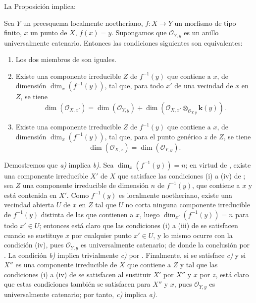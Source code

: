 La Proposición  implica:

\begin{corollary}[13.2.9]
\label{IV.13.2.9}
Sea $Y$ un preesquema localmente noetheriano, $f:X\to Y$ un morfismo de tipo finito, $x$ un punto de $X$, $f(x)=y$.
Supongamos que $\mathcal O_{Y,y}$ es un anillo universalmente catenario.
Entonces las condiciones siguientes son equivalentes:
\begin{enumerate}[label=\emph{\alph*)}]
  \item Los dos miembros de  son iguales.
  \item Existe una componente irreducible $Z$ de $f^{-1}(y)$ que contiene a $x$, de dimensión $\dim_x(f^{-1}(y))$, tal que, para todo $x'$ de una vecindad de $x$ en $Z$, se tiene
  \[
  \tag{13.2.9.1}
  \label{IV.13.2.9.1-fr}
    \dim(\mathcal O_{X,x'})=\dim(\mathcal O_{Y,y})
    +\dim(\mathcal O_{X,x'}\otimes_{\mathcal O_{Y,y}}\boldsymbol{k}(y)).
  \]
  \item Existe una componente irreducible $Z$ de $f^{-1}(y)$ que contiene a $x$, de dimensión $\dim_x(f^{-1}(y))$, tal que, para el punto genérico $z$ de $Z$, se tiene
  \[
  \tag{13.2.9.2}
  \label{IV.13.2.9.2-fr}
    \dim(\mathcal O_{X,z})=\dim(\mathcal O_{Y,y}).
  \]
\end{enumerate}
\end{corollary}

Demostremos que \emph{a)} implica \emph{b)}.
Sea $\dim_x(f^{-1}(y))=n$; en virtud de , existe una componente irreducible $X'$ de $X$ que satisface las condiciones (i) a (iv) de ; sea $Z$ una componente irreducible de dimensión $n$ de $f^{-1}(y)$, que contiene a $x$ y está contenida en $X'$.
Como $f^{-1}(y)$ es localmente noetheriano, existe una vecindad abierta $U$ de $x$ en $Z$ tal que $U$ no corta ninguna componente irreducible de $f^{-1}(y)$ distinta de las que contienen a $x$, luego  $\dim_{x'}(f^{-1}(y))=n$ para todo $x'\in U$; entonces está claro que las condiciones (i) a (iii) de  se satisfacen cuando se sustituye $x$ por cualquier punto $x'\in U$, y lo mismo ocurre con la condición (iv), pues $\mathcal O_{Y,y}$ es universalmente catenario; de donde la conclusión por .
La condición \emph{b)} implica trivialmente \emph{c)} por .
Finalmente, si se satisface \emph{c)} y si $X''$ es una componente irreducible de $X$ que contiene a $Z$ y tal que las condiciones (i) a (iv) de  se satisfacen al sustituir $X'$ por $X''$ y $x$ por $z$, está claro que estas condiciones también se satisfacen para $X''$ y $x$, pues $\mathcal O_{Y,y}$ es universalmente catenario; por tanto, \emph{c)} implica \emph{a)}.

